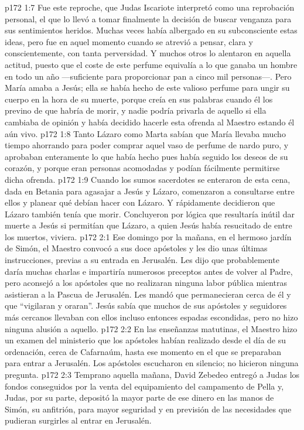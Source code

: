 \vs p172 1:7 Fue este reproche, que Judas Iscariote interpretó como una reprobación personal, el que lo llevó a tomar finalmente la decisión de buscar venganza para sus sentimientos heridos. Muchas veces había albergado en su subconsciente estas ideas, pero fue en aquel momento cuando se atrevió a pensar, clara y conscientemente, con tanta perversidad. Y muchos otros lo alentaron en aquella actitud, puesto que el coste de este perfume equivalía a lo que ganaba un hombre en todo un año ---suficiente para proporcionar pan a cinco mil personas---. Pero María amaba a Jesús; ella se había hecho de este valioso perfume para ungir su cuerpo en la hora de su muerte, porque creía en sus palabras cuando él los previno de que habría de morir, y nadie podría privarla de aquello si ella cambiaba de opinión y había decidido hacerle esta ofrenda al Maestro estando él aún vivo.
\vs p172 1:8 Tanto Lázaro como Marta sabían que María llevaba mucho tiempo ahorrando para poder comprar aquel vaso de perfume de nardo puro, y aprobaban enteramente lo que había hecho pues había seguido los deseos de su corazón, y porque eran personas acomodadas y podían fácilmente permitirse dicha ofrenda.
\vs p172 1:9 Cuando los sumos sacerdotes se enteraron de esta cena, dada en Betania para agasajar a Jesús y Lázaro, comenzaron a consultarse entre ellos y planear qué debían hacer con Lázaro. Y rápidamente decidieron que Lázaro también tenía que morir. Concluyeron por lógica que resultaría inútil dar muerte a Jesús si permitían que Lázaro, a quien Jesús había resucitado de entre los muertos, viviera.
\vs p172 2:1 Ese domingo por la mañana, en el hermoso jardín de Simón, el Maestro convocó a sus doce apóstoles y les dio unas últimas instrucciones, previas a su entrada en Jerusalén. Les dijo que probablemente daría muchas charlas e impartiría numerosos preceptos antes de volver al Padre, pero aconsejó a los apóstoles que no realizaran ninguna labor pública mientras asistieran a la Pascua de Jerusalén. Les mandó que permanecieran cerca de él y que “vigilaran y oraran”. Jesús sabía que muchos de sus apóstoles y seguidores más cercanos llevaban con ellos incluso entonces espadas escondidas, pero no hizo ninguna alusión a aquello.
\vs p172 2:2 En las enseñanzas matutinas, el Maestro hizo un examen del ministerio que los apóstoles habían realizado desde el día de su ordenación, cerca de Cafarnaúm, hasta ese momento en el que se preparaban para entrar a Jerusalén. Los apóstoles escucharon en silencio; no hicieron ninguna pregunta.
\vs p172 2:3 Temprano aquella mañana, David Zebedeo entregó a Judas los fondos conseguidos por la venta del equipamiento del campamento de Pella y, Judas, por su parte, depositó la mayor parte de ese dinero en las manos de Simón, su anfitrión, para mayor seguridad y en previsión de las necesidades que pudieran surgirles al entrar en Jerusalén.
